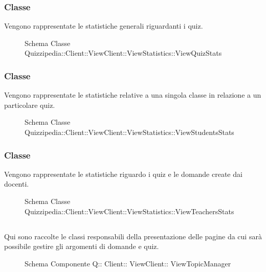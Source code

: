 \subsubsection{Classe }
Vengono rappresentate le statistiche generali riguardanti i quiz.
\begin{figure}[H]
\centering
\noindent{}
\caption[Schema Classe ViewQuizStats]{Schema Classe Quizzipedia::Client::ViewClient::ViewStatistics::ViewQuizStats}
\end{figure}
\subsubsection{Classe }
Vengono rappresentate le statistiche relative a una singola classe in relazione a un particolare quiz.
\begin{figure}[H]
\centering
\noindent{}
\caption[Schema Classe ViewStudentsStats]{Schema Classe Quizzipedia::Client::ViewClient::ViewStatistics::ViewStudentsStats}
\end{figure}
\subsubsection{Classe }
Vengono rappresentate le statistiche riguardo i quiz e le domande create dai docenti.
\begin{figure}[H]
\centering
\noindent{}
\caption[Schema Classe ViewTeachersStats]{Schema Classe Quizzipedia::Client::ViewClient::ViewStatistics::ViewTeachersStats}
\end{figure}
\subsection{}
Qui sono raccolte le classi responsabili della presentazione delle pagine da cui sarà possibile gestire gli argomenti di domande e quiz.
\begin{figure}[H]
\centering
\noindent{}
\caption[Schema Componente Quizzipedia::Client::ViewClient::ViewTopicManager]{Schema Componente Q:: Client:: ViewClient:: ViewTopicManager}
\end{figure}
